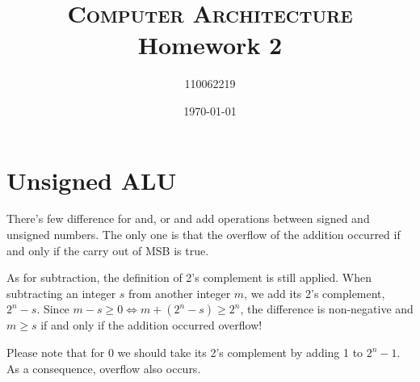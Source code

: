 \documentclass[12pt, a4paper]{article}
\title{\textsc{Computer Architecture} Homework 2}
\author{110062219}
\date{\today}
\begin{document}
\maketitle

\tableofcontents

\section{Unsigned ALU}

There's few difference for \textsf{and}, \textsf{or} and \textsf{add} operations between signed and unsigned numbers. The only one is that the \textsf{overflow} of the \textsf{addition} occurred if and only if the \textsf{carry out} of \textsf{MSB} is true.

As for \textsf{subtraction}, the definition of 2's complement is still applied. When subtracting an integer $s$ from another integer $m$, we add its 2's complement, $2^n-s$. Since $m-s\geq0\iff m+(2^n-s)\geq2^n$, the \textsf{difference} is non-negative and $m\geq s$ if and only if the addition occurred \textsf{overflow}!

Please note that for 0 we should take its 2's complement by adding 1 to $2^n-1$. As a consequence, \textsf{overflow} also occurs.
\end{document}
